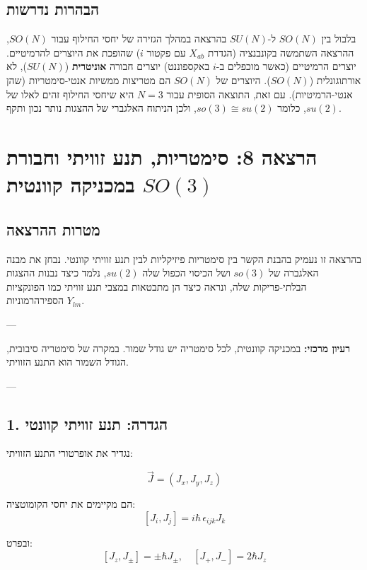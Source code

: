 \subsection*{הבהרות נדרשות }
\begin{warningbox}{בלבול בין $SO(N)$ ל-$SU(N)$ בהרצאה}
במהלך הגזירה של יחסי החילוף עבור $SO(N)$, ההרצאה השתמשה בקונבנציה (הגדרת $X_{ab}$ עם פקטור $i$) שהופכת את היוצרים להרמיטיים. יוצרים הרמיטיים (כאשר מוכפלים ב-$i$ באקספוננט) יוצרים חבורה \textbf{אוניטרית} ($SU(N)$), לא אורתוגונלית ($SO(N)$).
היוצרים של $SO(N)$ הם מטריצות ממשיות אנטי-סימטריות (שהן אנטי-הרמיטיות).
עם זאת, התוצאה הסופית עבור $N=3$ היא שיחסי החילוף זהים לאלו של $su(2)$, כלומר $so(3) \cong su(2)$, ולכן הניתוח האלגברי של ההצגות נותר נכון ותקף.
\end{warningbox}


\section*{הרצאה 8: סימטריות, תנע זוויתי וחבורת $SO(3)$ במכניקה קוונטית}

\subsection*{מטרות ההרצאה}
בהרצאה זו נעמיק בהבנת הקשר בין סימטריות פיזיקליות לבין תנע זוויתי קוונטי. נבחן את מבנה האלגברה של $so(3)$ ושל הכיסוי הכפול שלה $su(2)$, נלמד כיצד נבנות ההצגות הבלתי-פריקות שלה, ונראה כיצד הן מתבטאות במצבי תנע זוויתי כמו הפונקציות הספירהרמוניות $Y_{lm}$.

---

\begin{importantbox}
\textbf{רעיון מרכזי:}
במכניקה קוונטית, לכל סימטריה יש גודל שמור. במקרה של סימטריה סיבובית, הגודל השמור הוא התנע הזוויתי.
\end{importantbox}

---

\subsection*{1. הגדרה: תנע זוויתי קוונטי}

נגדיר את אופרטורי התנע הזוויתי:

\[
\vec{J} = (J_x, J_y, J_z)
\]

הם מקיימים את יחסי הקומוטציה:
\[
[J_i, J_j] = i\hbar \, \epsilon_{ijk} J_k
\]

ובפרט:
\[
[J_z, J_{\pm}] = \pm \hbar J_{\pm}, \quad [J_+, J_-] = 2\hbar J_z
\]

